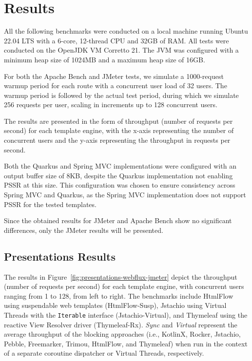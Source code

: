\section{Results}

All the following benchmarks were conducted on a local machine running Ubuntu
22.04 LTS with a 6-core, 12-thread CPU and 32GB of RAM\@. All tests were
conducted on the OpenJDK VM Corretto 21. The JVM was configured with a minimum
heap size of 1024MB and a maximum heap size of 16GB\@.

For both the Apache Bench and JMeter tests, we simulate a 1000-request warmup
period for each route with a concurrent user load of 32 users. The warmup
period is followed by the actual test period, during which we simulate 256
requests per user, scaling in increments up to 128 concurrent users.

The results are presented in the form of throughput (number of requests per
second) for each template engine, with the x-axis representing the number of
concurrent users and the y-axis representing the throughput in requests per
second.

Both the Quarkus and Spring MVC implementations were configured with an output
buffer size of 8KB, despite the Quarkus implementation not enabling PSSR at
this size. This configuration was chosen to ensure consistency across Spring
MVC and Quarkus, as the Spring MVC implementation does not support PSSR for the
tested templates.

Since the obtained results for JMeter and Apache Bench show no significant
differences, only the JMeter results will be presented.

\subsection{Presentations Results}

The results in Figure~\ref{fig:presentations-webflux-jmeter} depict the
throughput (number of requests per second) for each template engine, with
concurrent users ranging from 1 to 128, from left to right. The benchmarks
include HtmlFlow using suspendable web templates (HtmlFlow-Susp), Jstachio
using Virtual Threads with the \texttt{Iterable} interface (Jstachio-Virtual),
and Thymeleaf using the reactive View Resolver driver (Thymeleaf-Rx).
\textit{Sync} and \textit{Virtual} represent the average throughput of the
blocking approaches (i.e., KotlinX, Rocker, Jstachio, Pebble, Freemarker,
Trimou, HtmlFlow, and Thymeleaf) when run in the context of a separate
coroutine dispatcher or Virtual Threads, respectively.

